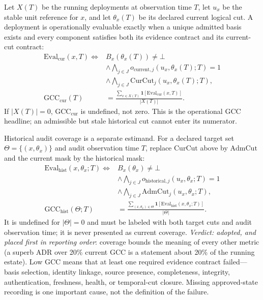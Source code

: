 \begin{metricdef}
\label{met:gcc}
Let $X(T)$ be the running deployments at observation time $T$, let $u_x$ be
the stable unit reference for $x$, and let $\theta_x(T)$ be its declared
current logical cut. A deployment is operationally evaluable exactly when a
unique admitted basis exists and every component satisfies both its evidence
contract and its current-cut contract:
\[
\begin{aligned}
\mathrm{Eval}_{\mathrm{cur}}(x,T)\Longleftrightarrow{}
&B_x(\theta_x(T))\neq\bot\\
&\land\bigwedge_{j\in J}
 o_{\mathrm{current},j}(u_x,\theta_x(T);T)=1\\
&\land\bigwedge_{j\in J}
 \mathrm{CurCut}_j(u_x,\theta_x(T);T),\\
\mathrm{GCC}_{\mathrm{cur}}(T)&=
 \frac{\sum_{x\in X(T)}\mathbf 1[\mathrm{Eval}_{\mathrm{cur}}(x,T)]}
 {|X(T)|}.
\end{aligned}
\]
If $|X(T)|=0$, $\mathrm{GCC}_{\mathrm{cur}}$ is undefined, not zero. This is
the operational GCC headline; an admissible but stale historical cut cannot
enter its numerator.

Historical audit coverage is a separate estimand. For a declared target set
$\Theta=\{(x,\theta_x)\}$ and audit observation time $T$, replace
$\mathrm{CurCut}$ above by $\mathrm{AdmCut}$ and the current mask by the
historical mask:
\[
\begin{aligned}
\mathrm{Eval}_{\mathrm{hist}}(x,\theta_x;T)\Longleftrightarrow{}
&B_x(\theta_x)\neq\bot\\
&\land\bigwedge_{j\in J}
 o_{\mathrm{historical},j}(u_x,\theta_x;T)=1\\
&\land\bigwedge_{j\in J}\mathrm{AdmCut}_j(u_x,\theta_x;T),\\
\mathrm{GCC}_{\mathrm{hist}}(\Theta;T)&=
 \frac{\sum_{(x,\theta_x)\in\Theta}
 \mathbf 1[\mathrm{Eval}_{\mathrm{hist}}(x,\theta_x;T)]}{|\Theta|}.
\end{aligned}
\]
It is undefined for $|\Theta|=0$ and must be labeled with both target cuts and
audit observation time; it is never presented as current coverage.
\emph{Verdict: adopted, and placed first in reporting order}: coverage bounds
the meaning of every other metric (a superb ADR over 20\% current GCC is a
statement about 20\% of the running estate). Low GCC means that at least one
required evidence contract failed---basis selection, identity linkage,
source presence, completeness, integrity, authentication, freshness, health,
or temporal-cut closure. Missing approved-state recording is one important
cause, not the definition of the failure.
\end{metricdef}

